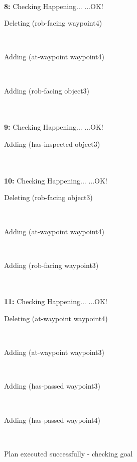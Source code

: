 \documentclass[a4paper,12pt]{article}
\newcommand{\atime}[1]{{\bf #1:}}
\newcommand{\exprn}[1]{{\sf #1}}
\newcommand{\checkhappening}{Checking Happening... }
\newcommand{\listrow}[1]{\begin{minipage}[t]{11.5cm} #1 \end{minipage}}
\newcommand{\happeningOK}{...OK!}
\newcommand{\adding}[1]{\listrow{Adding \exprn{#1} }}
\newcommand{\deleting}[1]{\listrow{Deleting \exprn{#1} }}
\begin{document}
\begin{tabbing}
\\
\atime{8} \> \checkhappening\happeningOK\\
 \> \deleting{(rob-facing waypoint4)}\\
 \> \adding{(at-waypoint waypoint4)}\\
 \> \adding{(rob-facing object3)}\\
\\
\atime{9} \> \checkhappening\happeningOK\\
 \> \adding{(has-inspected object3)}\\
\\
\atime{10} \> \checkhappening\happeningOK\\
 \> \deleting{(rob-facing object3)}\\
 \> \adding{(at-waypoint waypoint4)}\\
 \> \adding{(rob-facing waypoint3)}\\
\\
\atime{11} \> \checkhappening\happeningOK\\
 \> \deleting{(at-waypoint waypoint4)}\\
 \> \adding{(at-waypoint waypoint3)}\\
 \> \adding{(has-passed waypoint3)}\\
 \> \adding{(has-passed waypoint4)}\\
\end{tabbing}
Plan executed successfully - checking goal\\
\\
\end{document}
